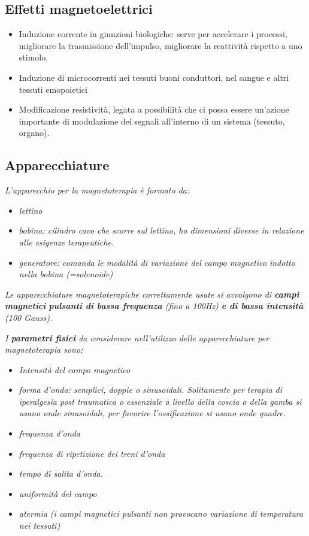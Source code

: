 \subsection{Effetti magnetoelettrici}

\begin{itemize}
\item
  Induzione corrente in giunzioni biologiche: serve per accelerare i
  processi, migliorare la trasmissione dell'impulso, migliorare la
  reattività rispetto a uno stimolo.
\item
  Induzione di microcorrenti nei tessuti buoni conduttori, nel sangue e
  altri tessuti emopoietici
\item
  Modificazione resistività, legata a possibilità che ci possa essere
  un'azione importante di modulazione dei segnali all'interno di un
  sistema (tessuto, organo).
\end{itemize}

\subsection{Apparecchiature}

\emph{L'apparecchio per la magnetoterapia è formato da:}

\begin{itemize}
\item
  \emph{lettino}
\item
  \emph{bobina: cilindro cavo che scorre sul lettino, ha dimensioni
  diverse in relazione alle esigenze terapeutiche.}
\item
  \emph{generatore: comanda le modalità di variazione del campo
  magnetico indotto nella bobina (=solenoide)}
\end{itemize}

\emph{Le apparecchiature magnetoterapiche correttamente usate si
avvalgono di \textbf{campi magnetici} \textbf{pulsanti di bassa
frequenza} (fino a 100Hz) \textbf{e di bassa intensità} (100 Gauss).}

\emph{I \textbf{parametri fisici} da considerare nell'utilizzo delle
apparecchiature per magnetoterapia sono:}

\begin{itemize}
\item
  \emph{Intensità del campo magnetico}
\item
  \emph{forma d'onda: semplici, doppie o sinusoidali. Solitamente per
  terapia di iperalgesia post traumatica o essenziale a livello della
  coscia o della gamba si usano onde sinusoidali, per favorire
  l'ossificazione si usano onde quadre.}
\item
  \emph{frequenza d'onda}
\item
  \emph{frequenza di ripetizione dei treni d'onda }
\item
  \emph{tempo di salita d'onda.}
\item
  \emph{uniformità del campo}
\item
  \emph{atermia (i campi magnetici pulsanti non provocano variazione di
  temperatura nei tessuti)}
\end{itemize}

